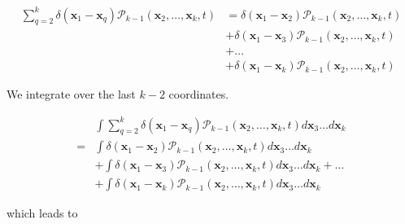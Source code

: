 \begin{subequations} 
\begin{align}
\sum_{q=2}^{k}\delta({\boldsymbol{x}_1-\boldsymbol{x}_q})\mathcal{P}_{k-1}(\boldsymbol{x}_{2},\ldots,\boldsymbol{x}_{k},t) & =\delta(\boldsymbol{x}_{1}-\boldsymbol{x}_{2})\mathcal{P}_{k-1}(\boldsymbol{x}_{2},\ldots,\boldsymbol{x}_{k},t)\\
 & +\delta(\boldsymbol{x}_{1}-\boldsymbol{x}_{3})\mathcal{P}_{k-1}(\boldsymbol{x}_{2},\ldots,\boldsymbol{x}_{k},t)\\
 & +\ldots\\
 & +\delta(\boldsymbol{x}_{1}-\boldsymbol{x}_{k})\mathcal{P}_{k-1}(\boldsymbol{x}_{2},\ldots,\boldsymbol{x}_{k},t)
\end{align}
\end{subequations}

\vspace{1.25em}

We integrate over the last $k-2$ coordinates.

\begin{subequations} 
\begin{flalign}
 & \int\sum_{q=2}^{k}\delta({\boldsymbol{x}_1-\boldsymbol{x}_q})\mathcal{P}_{k-1}(\boldsymbol{x}_{2},\ldots,\boldsymbol{x}_{k},t)d\boldsymbol{x}_{3}\ldots d\boldsymbol{x}_{k}\\
= & \int\delta(\boldsymbol{x}_{1}-\boldsymbol{x}_{2})\mathcal{P}_{k-1}(\boldsymbol{x}_{2},\ldots,\boldsymbol{x}_{k},t)d\boldsymbol{x}_{3}\ldots d\boldsymbol{x}_{k}\\
 & +\int\delta(\boldsymbol{x}_{1}-\boldsymbol{x}_{3})\mathcal{P}_{k-1}(\boldsymbol{x}_{2},\ldots,\boldsymbol{x}_{k},t)d\boldsymbol{x}_{3}\ldots d\boldsymbol{x}_{k}+\ldots\\
 & +\int\delta(\boldsymbol{x}_{1}-\boldsymbol{x}_{k})\mathcal{P}_{k-1}(\boldsymbol{x}_{2},\ldots,\boldsymbol{x}_{k},t)d\boldsymbol{x}_{3}\ldots d\boldsymbol{x}_{k}
\end{flalign}
\end{subequations}

which leads to

